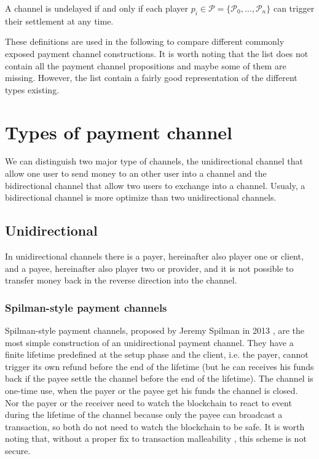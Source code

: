\begin{definition}[undelayed]
  A channel is undelayed if and only if each player $p_i \in \mathcal{P} = \{\mathcal{P}_0,
  \dots, \mathcal{P}_n\}$ can trigger their settlement at any time.
\end{definition}

These definitions are used in the following to compare different commonly exposed
payment channel constructions. It is worth noting that the list does not contain all
the payment channel propositions and maybe some of them are missing. However, the
list contain a fairly good representation of the different types existing.

\minitoc

\newpage

\section{Types of payment channel}

We can distinguish two major type of channels, the unidirectional channel that allow
one user to send money to an other user into a channel and the bidirectional channel
that allow two users to exchange into a channel. Usualy, a bidirectional channel is
more optimize than two unidirectional channels.

\subsection{Unidirectional}

In unidirectional channels there is a payer, hereinafter also player one or client, and
a payee, hereinafter also player two or provider, and it is not possible to transfer
money back in the reverse direction into the channel.

\subsubsection{Spilman-style payment channels}

Spilman-style payment channels, proposed by Jeremy Spilman in 2013 \cite{SpilmanStyle},
are the most simple construction of an unidirectional
payment channel. They have a finite lifetime predefined at the setup phase and the client,
i.e. the payer, cannot trigger its own refund before the end of the lifetime (but he can
receives his funds back if the payee settle the channel before the end of the lifetime).
The channel is one-time use, when the payer or the payee get his funds the channel is
closed. Nor the payer or the receiver need to watch the blockchain to react to event
during the lifetime of the channel because only the payee can broadcast a transaction,
so both do not need to watch the blockchain to be safe.
It is worth noting that, without a proper fix to transaction malleability
\cite{SegWitBIP, BIP62, DBLP:journals/corr/AndrychowiczDMM13, DBLP:journals/corr/DeckerW14},
this scheme is not secure.

